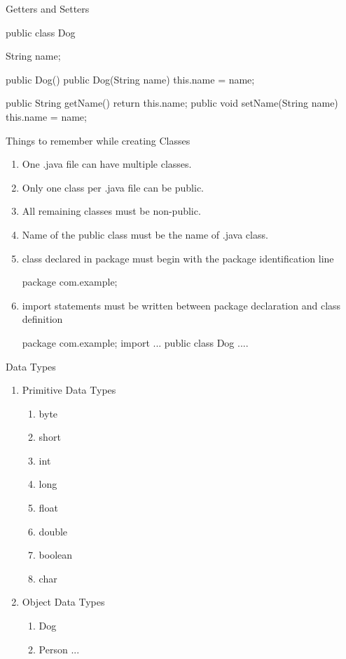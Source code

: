 \documentclass[11pt]{beamer}
\begin{document}
\begin{frame}[containsverbatim]{Getters and Setters}
\begin{java}
public class Dog{
  String name;  
  
  public Dog(){
  }
  public Dog(String name){
    this.name = name;
  }
  
  public String getName(){
    return this.name;  
  }
  public void setName(String name){
    this.name = name;
  }  
}
\end{java}
\end{frame}


\begin{frame}{Things to remember while creating Classes}

\begin{enumerate}
\item One .java file can have multiple classes.
\item Only one class per .java file can be public.
\item All remaining classes must be non-public.
\item Name of the public class must be the name of .java class.
\item class declared in package must begin with the package identification line
\begin{java}
package com.example;
\end{java}


\item import statements must be written between package declaration and class definition
\begin{java}
package com.example;
import ...
public class Dog{
  ....
}
\end{java}
\end{enumerate}
\end{frame}

\begin{frame}{Data Types}
\begin{enumerate}
\item Primitive Data Types
\begin{enumerate}
\item byte
\item short
\item int
\item long
\item float
\item double
\item boolean
\item char
\end{enumerate}
\item Object Data Types
\begin{enumerate}
\item Dog
\item Person ...
\end{enumerate}
\end{enumerate}
\end{frame}
\end{document}
